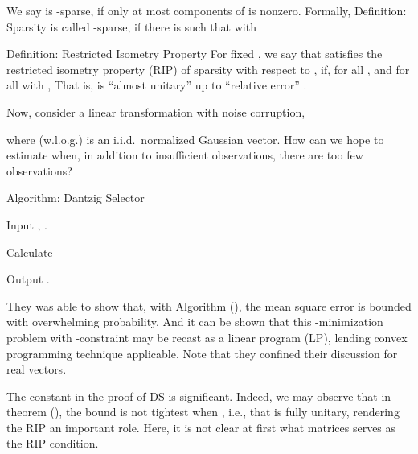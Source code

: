 We say  is -sparse, if only at most  components of  is nonzero.
Formally,
\Result
{Definition: Sparsity}
{
 is called -sparse, if there is  such that
with
}

\Result
{Definition: Restricted Isometry Property}
{
For fixed , we say that \m {\M{\Phi}} satisfies the restricted isometry property (RIP) of sparsity  with respect to , if, for all , and for all  with ,
}
That is, \m {\Phi} is ``almost unitary'' up to ``relative error'' .

Now, consider a linear transformation with noise corruption,


where (w.l.o.g.)  is an i.i.d.\ normalized Gaussian vector.
How can we hope to estimate  when, in addition to insufficient observations, there are too few observations?

\Result
{Algorithm: Dantzig Selector}
{
\startitemize[n]
\item Input , .
\item Calculate
\item Output .
}

They was able to show that, with Algorithm (), the mean square error is bounded with overwhelming probability.
And it can be shown that this -minimization problem with \m {\ell_\infty}-constraint may be recast as a linear program (LP), lending convex programming technique applicable.
Note that they confined their discussion for real vectors.

The constant \m {\d} in the proof of DS is significant.
Indeed, we may observe that in theorem (), the bound is not tightest when , i.e., that \m {\Phi} is fully unitary, rendering the RIP an important role.
Here, it is not clear at first what matrices serves as the RIP condition.

